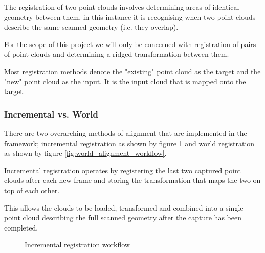 \documentclass{entcs}
\begin{document}
The registration of two point clouds involves determining areas of identical
geometry between them, in this instance it is recognising when two point clouds
describe the same scanned geometry (i.e. they overlap).

For the scope of this project we will only be concerned with registration of
pairs of point clouds and determining a ridged transformation between them.

Most registration methods denote the "existing" point cloud as the target and
the "new" point cloud as the input. It is the input cloud that is mapped onto
the target.

\subsubsection{Incremental vs. World}

There are two overarching methods of alignment that are implemented in the
framework; incremental registration as shown by figure
\ref{fig:incremental_alignment_workflow} and world registration as shown by
figure \ref{fig:world_alignment_workflow}.

Incremental registration operates by registering the last two captured point
clouds after each new frame and storing the transformation that maps the two on
top of each other.

This allows the clouds to be loaded, transformed and combined into a single
point cloud describing the full scanned geometry after the capture has been
completed.

\begin{figure}[h!]
  \centering
  \caption{Incremental registration workflow}
  \label{fig:incremental_alignment_workflow}
\end{figure}
\end{document}
